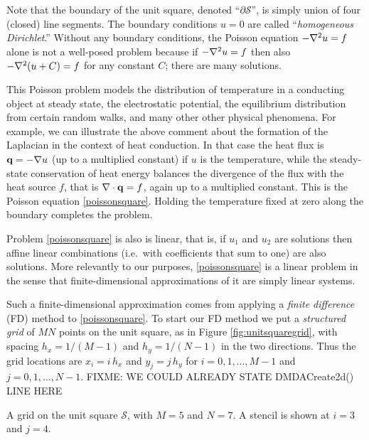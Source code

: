 Note that the boundary of the unit square, denoted ``$\partial\mathcal{S}$'', is simply union of four (closed) line segments.  The boundary conditions $u=0$ are called ``\emph{homogeneous Dirichlet}.''  Without any boundary conditions, the Poisson equation $-\nabla^2 u = f$ alone is not a well-posed problem because if $-\nabla^2 u = f$ then also $-\nabla^2(u+C)=f$ for any constant $C$; there are many solutions.

This Poisson problem models the distribution of temperature in a conducting object at steady state, the electrostatic potential, the equilibrium distribution from certain random walks, and many other other physical phenomena.  For example, we can illustrate the above comment about the formation of the Laplacian in the context of heat conduction.  In that case the heat flux is $\mathbf{q} = - \nabla u$ (up to a multiplied constant) if $u$ is the temperature, while the steady-state conservation of heat energy balances the divergence of the flux with the heat source $f$, that is $\nabla\cdot \mathbf{q} = f$, again up to a multiplied constant.  This is the Poisson equation \eqref{poissonsquare}.  Holding the temperature fixed at zero along the boundary completes the problem.

Problem \eqref{poissonsquare} is also is linear, that is, if $u_1$ and $u_2$ are solutions then affine linear combinations (i.e.~with coefficients that sum to one) are also solutions.  More relevantly to our purposes, \eqref{poissonsquare} is a linear problem in the sense that finite-dimensional approximations of it are simply linear systems.

Such a finite-dimensional approximation comes from applying a \emph{finite difference} (FD) method to \eqref{poissonsquare}.  To start our FD method we put a \emph{structured grid} of $MN$ points on the unit square, as in Figure \ref{fig:unitsquaregrid}, with spacing $h_x=1/(M-1)$ and $h_y=1/(N-1)$ in the two directions.  Thus the grid locations are $x_i = i\, h_x$ and $y_j = j\, h_y$ for $i = 0,1,\dots,M-1$ and $j=0,1,\dots,N-1$.  FIXME: WE COULD ALREADY STATE DMDACreate2d() LINE HERE

\begin{marginfigure}
\caption{A grid on the unit square $\mathcal{S}$, with $M=5$ and $N=7$.  A stencil is shown at $i=3$ and $j=4$.}
\label{fig:unitsquaregrid}
\end{marginfigure}

